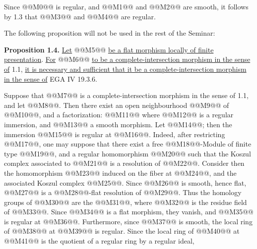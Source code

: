 Since @@M0@@ is regular, and @@M1@@ and @@M2@@ are smooth, it follows by 1.3 that @@M3@@ and @@M4@@ are regular.

The following proposition will not be used in the rest of the Seminar:

\textbf{Proposition 1.4.} \uline{Let} @@M5@@ \uline{be a flat morphism locally of finite presentation}. \uline{For} @@M6@@ \uline{to be a complete-intersection morphism in the sense of} 1.1, \uline{it is necessary and sufficient that it be a complete-intersection morphism in the sense of} EGA IV 19.3.6.

Suppose that @@M7@@ is a complete-intersection morphism in the sense of 1.1, and let @@M8@@. Then there exist an open neighbourhood @@M9@@ of @@M10@@, and a factorization:
@@M11@@
where @@M12@@ is a regular immersion, and @@M13@@ a smooth morphism. Let @@M14@@; then the immersion @@M15@@ is regular at @@M16@@. Indeed, after restricting @@M17@@, one may suppose that there exist a free @@M18@@-Module of finite type @@M19@@, and a regular homomorphism @@M20@@ such that the Koszul complex associated to @@M21@@ is a resolution of @@M22@@. Consider then the homomorphism @@M23@@ induced on the fiber at @@M24@@, and the associated Koszul complex @@M25@@. Since @@M26@@ is smooth, hence flat, @@M27@@ is a @@M28@@-flat resolution of @@M29@@. Thus the homology groups of @@M30@@ are the @@M31@@, where @@M32@@ is the residue field of @@M33@@. Since @@M34@@ is a flat morphism, they vanish, and @@M35@@ is regular at @@M36@@. Furthermore, since @@M37@@ is smooth, the local ring of @@M38@@ at @@M39@@ is regular. Since the local ring of @@M40@@ at @@M41@@ is the quotient of a regular ring by a regular ideal,
